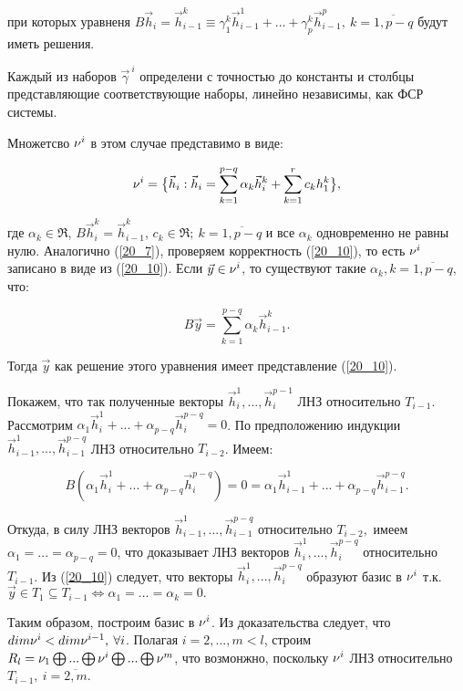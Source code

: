 при которых уравненя $B\vec{h}_i = \vec{h}_{i-1}^k \equiv \gamma_1^k \vec{h}_{i-1}^1 + ... + \gamma_p^k \vec{h}_{i-1}^p, \: k = \overline{1, p-q}$ будут иметь решения.

Каждый из наборов $\vec{\gamma}^{\: i}$ определени с точностью до константы и столбцы представляющие соответствующие наборы, линейно независимы, как ФСР системы.

Множетсво $\nu^i$ в этом случае представимо в виде:

\begin{equation}\label{20_10}
\nu^i = \big\lbrace \vec{h}_i: \vec{h}_i = \sum\limits_{k=1}^{p-q}\alpha_k \vec{h}_i^k + \sum\limits_{k=1}^r c_k h_1^k \big\rbrace,
\end{equation}

где $\alpha_k \in  \Re$, $B \vec{h}_i^k = \vec{h}_{i-1}^k$, $c_k \in \Re; \: k = \overline{1, p-q}$ и все $\alpha_k$ одновременно не равны нулю. Аналогично (\ref{20_7}), проверяем корректность (\ref{20_10}), то есть $\nu^i$ записано в виде из (\ref{20_10}). Если $\vec{y} \in \nu^i$, то существуют такие $\alpha_k, k = \overline{1, p-q}$, что:

\[B \vec{y} = \sum\limits_{k=1}^{p-q} \alpha_k \vec{h}_{i-1}^k.\]

Тогда $\vec{y}$ как решение этого уравнения имеет представление (\ref{20_10}).

Покажем, что так полученные векторы $\vec{h}_i^1, ... , \vec{h}_i^{p-1}$ ЛНЗ относительно $T_{i-1}$. Рассмотрим $\alpha_1 \vec{h}_i^1 + ... + \alpha_{p-q} \vec{h}_i^{p-q} = 0$. По предположению индукции $\vec{h}_{i-1}^1, ... , \vec{h}_{i-1}^{p-q}$ ЛНЗ относительно $T_{i-2}$. Имеем:

\[B(\alpha_1 \vec{h}_i^1 + ... + \alpha_{p-q}\vec{h}_i^{p-q}) = 0 = \alpha_1 \vec{h}_{i-1}^1 + ... + \alpha_{p-q} \vec{h}_{i-1}^{p-q}.\]

Откуда, в силу ЛНЗ векторов $\vec{h}_{i-1}^1, ... ,\vec{h}_{i-1}^{p-q}$ относительно $T_{i-2},$ имеем $\alpha_1 = ... = \alpha_{p-q} = 0$, что доказывает ЛНЗ векторов $\vec{h}_i^1, ... , \vec{h}_i^{p-q}$ относительно $T_{i-1}$. Из (\ref{20_10}) следует, что векторы $\vec{h}_i^1, ... , \vec{h}_i^{p-q}$ образуют базис в $\nu^i$ т.к. $\vec{y} \in T_1\subseteq T_{i-1} \Leftrightarrow \alpha_1 = ... = \alpha_k = 0.$

Таким образом, построим базис в $\nu^i$. Из доказательства следует, что $dim \nu^i < dim \nu^{i-1}, \: \forall i$. Полагая $i = 2, ... ,m < l$, строим $R_l = \nu_1 \bigoplus ... \bigoplus \nu^i \bigoplus ... \bigoplus \nu^m$, что возмонжно, поскольку $\nu^i$ ЛНЗ относительно $T_{i-1}, \: i = \overline{2,m}$.
